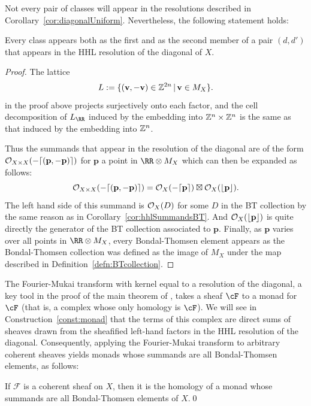 \documentclass{amsart}
\begin{document}
Not every pair of \BT classes will appear in the resolutions described in Corollary~\ref{cor:diagonalUniform}.
Nevertheless, the following statement holds:
\begin{cor}\label{cor:diagonal-BTcollection}
Every \BT class appears both as the first and as the second member of a pair $(d,d')$ that appears in the HHL resolution of the diagonal of $X$. \end{cor}
\begin{proof}
The lattice 
\[
L := \{(\mathbf{v},-\mathbf{v}) \in \mathbb Z^{2n} \,|\, \mathbf{v}\in M_X\}.
\] 
in the proof above projects surjectively onto each factor, and the cell decomposition of $L_{\RR}$
induced by the embedding into $\mathbb Z^{n}\times \mathbb Z^{n}$ is the same as that induced by the embedding into
$\mathbb Z^{n}$.
  
  
  Thus the summands that appear in the resolution of the diagonal are of the form ${\mathcal O}_{X\times X}(-\lceil (\mathbf{p},-\mathbf{p})\rceil)$ for $\mathbf{p}$ a point in $\RR \otimes M_X$ which can then be expanded as follows:
  \[
  {\mathcal O}_{X\times X}(-\lceil (\mathbf{p},-\mathbf{p})\rceil)={\mathcal O}_X(-\lceil \mathbf{p}\rceil)\boxtimes {\mathcal O}_X(\lfloor \mathbf{p}\rfloor).
  \]
  The left hand side of this summand is ${\mathcal O}_X(D)$ for some $D$ in the BT collection by the same reason as in Corollary~\ref{cor:hhlSummandsBT}. And ${\mathcal O}_X(\lfloor \mathbf{p}\rfloor)$ is quite directly the generator of the BT collection associated to $\mathbf{p}$. Finally, as $\mathbf{p}$ varies over all points in $\RR \otimes M_X$, every Bondal-Thomsen element appears as the Bondal-Thomsen collection was defined as the image of $M_X$ under the map described in Definition~\ref{defn:BTcollection}.
\end{proof}

The Fourier-Mukai transform with kernel equal to a resolution of the diagonal,  a key tool in the proof of the main theorem of \cite{BES20}, takes a sheaf $\cF$ to a monad for $\cF$ (that is, a complex whose only homology is $\cF$).  We will see in Construction~\ref{const:monad} that the terms of this complex are direct sums of sheaves
 drawn from the sheafified left-hand factors in the HHL resolution of the diagonal. Consequently, applying the Fourier-Mukai transform to arbitrary coherent sheaves yields monads whose summands are all Bondal-Thomsen elements, as follows:

\begin{cor}
  If $\mathcal{F}$ is a coherent sheaf on $X$, then it is the homology of a monad whose summands are all Bondal-Thomsen elements of $X$.\qed
\end{cor}
\end{document}
